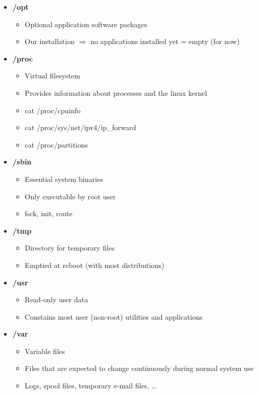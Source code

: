 \documentclass{article}
\begin{document}
\begin{itemize}
    \item \textbf{/opt}
    \begin{itemize}
        \item Optional application software packages
        \item Our installation $\Rightarrow$ no applications installed yet = empty (for now)
    \end{itemize}
    \item \textbf{/proc}
    \begin{itemize}
        \item Virtual filesystem
        \item Provides information about processes and the linux kernel
        \item cat /proc/cpuinfo
        \item cat /proc/sys/net/ipv4/ip\_forward
        \item cat /proc/partitions
    \end{itemize}
    \item \textbf{/sbin}
    \begin{itemize}
        \item Essential system binaries
        \item Only executable by root user
        \item fsck, init, route
    \end{itemize}
    \item \textbf{/tmp}
    \begin{itemize}
        \item Directory for temporary files
        \item Emptied at reboot (with most distributions)
    \end{itemize}
    \item \textbf{/usr}
    \begin{itemize}
        \item Read-only user data
        \item Constains most user (non-root) utilities and applications
    \end{itemize}
    \item \textbf{/var}
    \begin{itemize}
        \item Variable files
        \item Files that are expected to change continuously during normal system use
        \item Logs, spool files, temporary e-mail files, \dots
    \end{itemize}
\end{itemize}
\end{document}

